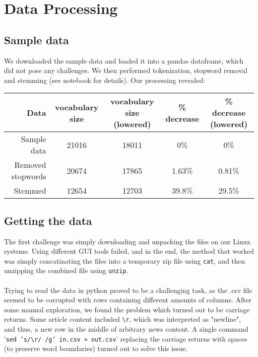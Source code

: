 \documentclass{article}
\begin{document}
\maketitle





\section{Data Processing}
\subsection{Sample data}
We downloaded the sample data and loaded it into a pandas dataframe, which did not pose any challenges. 
We then performed tokenization, stopword removal and stemming (see notebook for details). Our processing revealed:
\begin{table}[h]
    \centering
    \begin{tabular}{r| c | c | c| c}
      Data& vocabulary size & vocabulary size (lowered) & \% decrease & \% decrease (lowered)\\
        \hline
      Sample data& 21016 & 18011 & 0\% & 0\% \\
    \hline
      Removed stopwords & 20674 & 17865 & 1.63\% & 0.81\% \\
    \hline
      Stemmed & 12654 & 12703 & 39.8\% & 29.5\%
    \end{tabular}
\end{table}

\label{sec:headings}
\subsection{Getting the data}
The first challenge was simply downloading and unpacking the files on our Linux systems. Using different GUI tools failed, and in the end, the method that worked was simply concatinating the files into a temporary zip file using \texttt{cat}, and then unzipping the combined file using \texttt{unzip}.\\
\\
Trying to read the data in python proved to be a challenging task, as the .csv file seemed to be corrupted with rows containing different amounts of columns. After some manual exploration, we found the problem which turned out to be carriage returns. Some article content included \texttt{\textbackslash r}, which was interpreted as "newline", and thus, a new row in the middle of arbitrary news content. A single command '\texttt{sed 's/\textbackslash r/ /g' in.csv > out.csv}' replacing the carriage returns with spaces (to preserve word boundaries) turned out to solve this issue.\\
\end{document}
